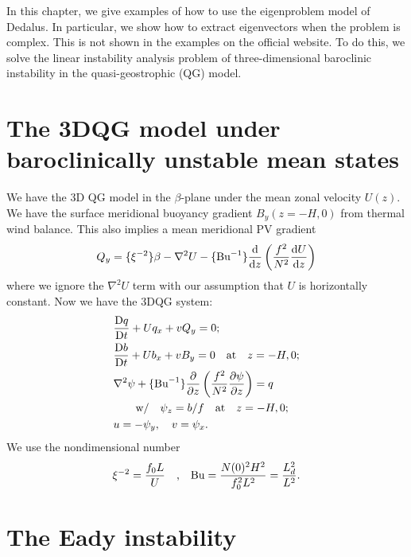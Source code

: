 In this chapter, we give examples of how to use the eigenproblem model of Dedalus. In particular, we show how to extract eigenvectors when the problem is complex. This is not shown in the examples on the official website. To do this, we solve the linear instability analysis problem of three-dimensional baroclinic instability in the quasi-geostrophic (QG) model.

\section{The 3DQG model under baroclinically unstable mean states}
We have the 3D QG model in the $\beta$-plane under the mean zonal velocity $U(z)$. We have the surface meridional buoyancy gradient $B_y(z=-H, 0)$ from thermal wind balance. This also implies a mean meridional PV gradient
\begin{align}
    Q_y = \{\xi^{-2}\}\beta-\nabla^2 U-\{\text{Bu}^{-1}\}\frac{\mathrm{d}}{\mathrm{d} z}\left(\frac{f^2}{N^2}\frac{\mathrm{d} U}{\mathrm{d} z}\right)
\end{align}
where we ignore the $\nabla^2 U$ term with our assumption that $U$ is horizontally constant. Now we have the 3DQG system:
\begin{align}
    &\frac{\mathrm{D} q}{\mathrm{D} t}+Uq_x+vQ_y = 0; \\
    &\frac{\mathrm{D} b}{\mathrm{D} t}+Ub_x+vB_y = 0 \quad \mbox{at} \quad z=-H, 0; \\
    &\nabla^2\psi + \{\text{Bu}^{-1}\}\frac{\partial}{\partial z}\left(\frac{f^2}{N^2}\frac{\partial\psi}{\partial z}\right) = q \\
    &\quad\quad \mbox{w/} \quad \psi_z = b/f \quad \mbox{at} \quad z=-H, 0; \\
    &u = -\psi_y, \quad v = \psi_x.
\end{align}
We use the nondimensional number
\begin{align}
    \xi^{-2} = \frac{f_0 L}{U} \quad \mbox{,} \quad \text{Bu} = \frac{N(0)^2H^2}{f_0^2L^2} = \frac{L_{d}^2}{L^2}.
\end{align}

\section{The Eady instability}


